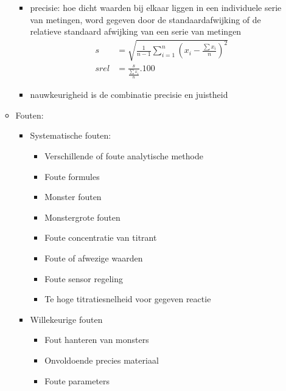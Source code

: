 \documentclass[10pt]{report}
\begin{document}
\begin{itemize}
\begin{itemize}
\begin{itemize}
                    \item precisie: hoe dicht waarden bij elkaar liggen in een individuele serie van metingen, word gegeven door de standaardafwijking of de relatieve standaard afwijking van een serie van metingen
                        \begin{equation*}
                            \begin{split}
                                s &= \sqrt{\frac{1}{n-1}\sum_{i=1}^n{(x_i - \frac{\sum{x_i}}{n})^2}}\\
                                srel &= \frac{s}{\frac{\sum{x_i}}{n}}.100
                            \end{split}
                        \end{equation*}
                    \item nauwkeurigheid is de combinatie precisie en juistheid
                \end{itemize}
            \item Fouten:
                \begin{itemize}
                    \item Systematische fouten:
                        \begin{itemize}
                            \item Verschillende of foute analytische methode
                            \item Foute formules
                            \item Monster fouten
                            \item Monstergrote fouten
                            \item Foute concentratie van titrant
                            \item Foute of afwezige waarden
                            \item Foute sensor regeling
                            \item Te hoge titratiesnelheid voor gegeven reactie
                        \end{itemize}
                    \item Willekeurige fouten
                        \begin{itemize}
                            \item Fout hanteren van monsters
                            \item Onvoldoende precies materiaal
                            \item Foute parameters

\end{itemize}
\end{itemize}
\end{itemize}
\end{itemize}
\end{document}
